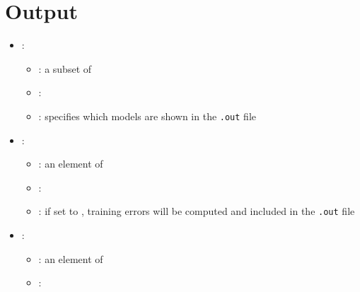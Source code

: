 \section{Output}



\begin{itemize}
    \item {}:
           \begin{itemize}
                \item \optionPossibleValues{}: a subset of 
                \item \optionDefaultValue{}: 
                \item \optionDescrption{}: specifies which models are shown in the \texttt{.out} file
           \end{itemize}
    \item {}:
           \begin{itemize}
                \item \optionPossibleValues{}: an element of 
                \item \optionDefaultValue{}: 
                \item \optionDescrption{}: if set to , training errors will be computed and included in the \texttt{.out} file
           \end{itemize}
    \item {}:
           \begin{itemize}
                \item \optionPossibleValues{}: an element of 
                \item \optionDefaultValue{}: 

\end{itemize}
\end{itemize}
